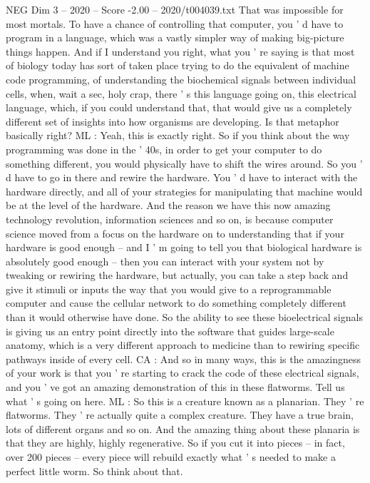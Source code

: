 \begin{textsample}{NEG Dim 3 – 2020 – Score -2.00 – 2020/t004039.txt}
That was impossible for most mortals.
To have a chance of controlling that computer, you ' d have to program in a language, which was a vastly simpler way of making big-picture things happen.
And if I understand you right, what you ' re saying is that most of biology today has sort of taken place trying to do the equivalent of machine code programming, of understanding the biochemical signals between individual cells, when, wait a sec, holy crap, there ' s this language going on, this electrical language, which, if you could understand that, that would give us a completely different set of insights into how organisms are developing.
Is that metaphor basically right?
ML : Yeah, this is exactly right.
So if you think about the way programming was done in the ' 40s, in order to get your computer to do something different, you would physically have to shift the wires around.
So you ' d have to go in there and rewire the hardware.
You ' d have to interact with the hardware directly, and all of your strategies for manipulating that machine would be at the level of the hardware.
And the reason we have this now amazing technology revolution, information sciences and so on, is because computer science moved from a focus on the hardware on to understanding that if your hardware is good enough -- and I ' m going to tell you that biological hardware is absolutely good enough -- then you can interact with your system not by tweaking or rewiring the hardware, but actually, you can take a step back and give it stimuli or inputs the way that you would give to a reprogrammable computer and cause the cellular network to do something completely different than it would otherwise have done.
So the ability to see these bioelectrical signals is giving us an entry point directly into the software that guides large-scale anatomy, which is a very different approach to medicine than to rewiring specific pathways inside of every cell.
CA : And so in many ways, this is the amazingness of your work is that you ' re starting to crack the code of these electrical signals, and you ' ve got an amazing demonstration of this in these flatworms.
Tell us what ' s going on here.
ML : So this is a creature known as a planarian.
They ' re flatworms.
They ' re actually quite a complex creature.
They have a true brain, lots of different organs and so on.
And the amazing thing about these planaria is that they are highly, highly regenerative.
So if you cut it into pieces -- in fact, over 200 pieces -- every piece will rebuild exactly what ' s needed to make a perfect little worm.
So think about that.

\end{textsample}
